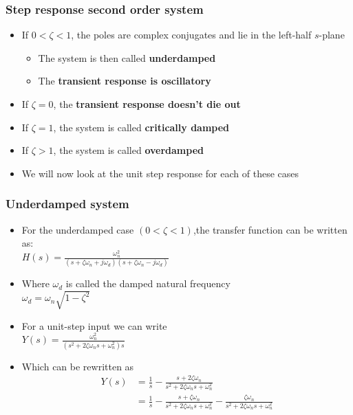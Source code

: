\begin{frame}
\frametitle{Step response second order system}
\begin{itemize}
\item If $0<\zeta<1$, the poles are complex conjugates and lie in the left-half $s$-plane
\begin{itemize}
\item The system is then called \textbf{underdamped}
\item The \textbf{transient response is oscillatory}
\end{itemize}
\item If $\zeta=0$, the \textbf{transient response doesn't die out}
\item If $\zeta=1$, the system is called \textbf{critically damped}
\item If $\zeta>1$, the system is called \textbf{overdamped}
\item We will now look at the unit step response for each of these cases
\end{itemize}
\end{frame}

\begin{frame}
\frametitle{Underdamped system}
\begin{itemize}
\item For the underdamped case $(0< \zeta< 1)$,the transfer function can be written as:\\ $H(s)=\frac{\omega_n ^2}{(s+\zeta\omega_n+j\omega_d)(s+\zeta\omega_n-j\omega_d)}$
\item Where $\omega_d$ is called the damped natural frequency
\\ $\omega_d = \omega_n\sqrt{1-\zeta^2}$
\item For a unit-step input we can write
\\ $Y(s)=\frac{\omega_n ^2}{(s^2+2\zeta\omega_n s+\omega_n ^2)s}$
\item Which can be rewritten as\\
\vspace{-0.5cm}
\begin{align*}
Y(s)&=\frac{1}{s} -\frac{s+2\zeta\omega_n}{s^2+2\zeta\omega_n s+ \omega_n ^2} \\
&= \frac{1}{s} -\frac{s+\zeta\omega_n}{s^2+2\zeta\omega_n s+ \omega_n ^2} -\frac{\zeta\omega_n}{s^2+2\zeta\omega_n s+ \omega_n ^2}
\end{align*}
\end{itemize}
\end{frame}



